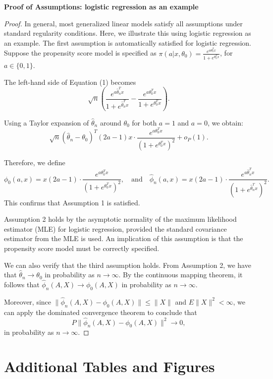 \documentclass{article}
\begin{document}
\textbf{Proof of Assumptions: logistic regression as an example}
\begin{proof}
In general, most generalized linear models satisfy all assumptions under standard regularity conditions. Here, we illustrate this using logistic regression as an example. The first assumption is automatically satisfied for logistic regression. Suppose the propensity score model is specified as $\pi(a|x, \theta_0) = \frac{e^{a\theta_0^T x}}{1 + e^{\theta_0^T x}}$, for $a \in \{0, 1\}$. 

The left-hand side of Equation (1) becomes 
\[
\sqrt{n} \left( \frac{e^{a \hat{\theta}_n^T x}}{1 + e^{\hat{\theta}_n^T x}} - \frac{e^{a \theta_0^T x}}{1 + e^{\theta_0^T x}} \right).
\]

Using a Taylor expansion of $\hat{\theta}_n$ around $\theta_0$ for both $a = 1$ and $a = 0$, we obtain:
\[
\sqrt{n}(\hat{\theta}_n - \theta_0)^T (2a - 1) x \cdot \frac{e^{a \theta_0^T x}}{(1 + e^{\theta_0^T x})^2} + o_P(1).
\]

Therefore, we define
\[
\phi_0(a, x) = x(2a - 1) \cdot \frac{e^{a \theta_0^T x}}{(1 + e^{\theta_0^T x})^2}, \quad \text{and} \quad \hat{\phi}_n(a, x) = x(2a - 1) \cdot \frac{e^{a \hat{\theta}_n^T x}}{(1 + e^{\hat{\theta}_n^T x})^2}.
\]
This confirms that Assumption 1 is satisfied.

Assumption 2 holds by the asymptotic normality of the maximum likelihood estimator (MLE) for logistic regression, provided the standard covariance estimator from the MLE is used. An implication of this assumption is that the propensity score model must be correctly specified.


We can also verify that the third assumption holds. From Assumption 2, we have that $\hat{\theta}_n \rightarrow \theta_0$ in probability as $n \rightarrow \infty$. By the continuous mapping theorem, it follows that $\hat{\phi}_n(A, X) \rightarrow \phi_0(A, X)$ in probability as $n \rightarrow \infty$. 

Moreover, since $\|\hat{\phi}_n(A, X) - \phi_0(A, X)\| \leq \|X\|$ and $E\|X\|^2 < \infty$, we can apply the dominated convergence theorem to conclude that 
\[
P\|\hat{\phi}_n(A, X) - \phi_0(A, X)\|^2 \rightarrow 0,
\]
in probability as $n \rightarrow \infty$.


\end{proof}
\clearpage

\section{Additional Tables and Figures\label{app2}}%
\end{document}
